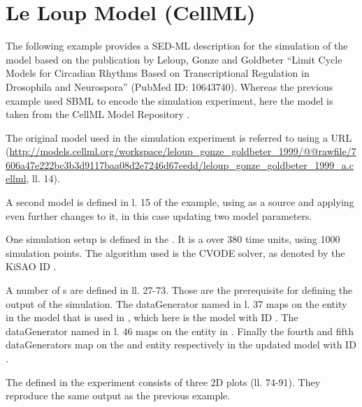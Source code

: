 \section{Le Loup Model (CellML)}
The following example provides a SED-ML description for the simulation of the model based on the publication by Leloup, Gonze and Goldbeter ``Limit Cycle Models for Circadian Rhythms Based on Transcriptional Regulation in Drosophila and Neurospora'' (PubMed ID: 10643740). Whereas the previous example used SBML to encode the simulation experiment, here the model is taken from the CellML Model Repository \citep{LLH+08}. 

The original model used in the simulation experiment is referred to using a URL (\url{http://models.cellml.org/workspace/leloup_gonze_goldbeter_1999/@@rawfile/7606a47e222bc3b3d9117baa08d2e7246d67eedd/leloup_gonze_goldbeter_1999_a.cellml}, ll. 14).

A second model is defined in l. 15 of the example, using  as a source and applying even further changes to it, in this case updating two model parameters.

One simulation setup is defined in the . It is a  over 380 time units, using 1000 simulation points. The algorithm used is the CVODE solver, as denoted by the KiSAO ID .

A number of s are defined in ll. 27-73. Those are the prerequisite for defining the output of the simulation. The dataGenerator named  in l. 37 maps on the  entity in the model that is used in , which here is the model with ID . The dataGenerator named  in l. 46 maps on the  entity in . Finally  the fourth and fifth dataGenerators map on the  and  entity respectively in the updated model with ID .

The  defined in the experiment consists of three 2D plots (ll. 74-91). They reproduce the same output as the previous example. 




